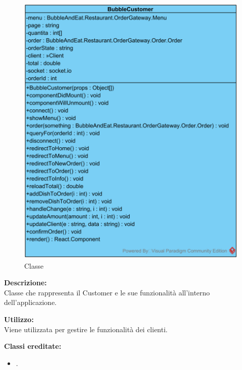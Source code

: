 \paragraph[::BubbleCustomer]{\class}\mbox{}\\ \label{\class}
\begin{figure}[H]
	\centering
	\includegraphics[width=12cm]{./diagrammi/demo/client/customer/bubblecustomer.png}
	\caption{Classe \class}
\end{figure}
\textbf{Descrizione:}\\
Classe che rappresenta il Customer e le sue funzionalità all'interno dell'applicazione.

\textbf{Utilizzo:}\\
Viene utilizzata per gestire le funzionalità dei clienti.

\textbf{Classi ereditate:}
\begin{itemize}
	\item {}.
\end{itemize}


